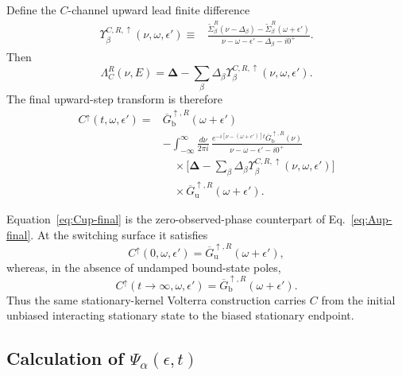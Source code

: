 \documentclass[
 reprint,
 superscriptaddress,
 amsmath,amssymb,
 aps,prb,
 longbibliography,
 floatfix
]{revtex4-2}
\begin{document}
Define the $C$-channel upward lead finite difference
\begin{equation*}
\begin{aligned}
\Upsilon_\beta^{C,R,\uparrow}
(\nu,\omega,\epsilon')
\equiv{}&
\frac{
\widetilde\Sigma_\beta^R(\nu-\Delta_\beta)
-
\widetilde\Sigma_\beta^R(\omega+\epsilon')}
{\nu-\omega-\epsilon'-\Delta_\beta-i0^+}.
\end{aligned}
\end{equation*}
Then
\begin{equation*}
\Lambda_C^R(\nu,E)
=
\bm\Delta
-
\sum_\beta
\Delta_\beta
\Upsilon_\beta^{C,R,\uparrow}
(\nu,\omega,\epsilon').
\end{equation*}
The final upward-step transform is therefore
\begin{equation}
\boxed{
\begin{aligned}
C^\uparrow(t,\omega,\epsilon')
={}&
\overline G_{\mathrm b}^{\uparrow,R}
(\omega+\epsilon')
\\
&-
\int_{-\infty}^{\infty}
\frac{d\nu}{2\pi i}\,
\frac{
e^{-i[\nu-(\omega+\epsilon')]t}
\overline G_{\mathrm b}^{\uparrow,R}(\nu)}
{\nu-\omega-\epsilon'-i0^+}
\\
&\quad\times
\Bigg[
\bm\Delta
-
\sum_\beta
\Delta_\beta
\Upsilon_\beta^{C,R,\uparrow}
(\nu,\omega,\epsilon')
\Bigg]
\\
&\quad\times
\overline G_{\mathrm u}^{\uparrow,R}(\omega+\epsilon').
\end{aligned}}
\label{eq:Cup-final}
\end{equation}

Equation~\eqref{eq:Cup-final} is the zero-observed-phase counterpart of Eq.~\eqref{eq:Aup-final}. At the switching surface it satisfies
\begin{equation*}
C^\uparrow(0,\omega,\epsilon')
=
\overline G_{\mathrm u}^{\uparrow,R}(\omega+\epsilon'),
\end{equation*}
whereas, in the absence of undamped bound-state poles,
\begin{equation*}
C^\uparrow(t\rightarrow\infty,\omega,\epsilon')
=
\overline G_{\mathrm b}^{\uparrow,R}(\omega+\epsilon').
\end{equation*}
Thus the same stationary-kernel Volterra construction carries $C$ from the initial unbiased interacting stationary state to the biased stationary endpoint.

\subsection{Calculation of $\Psi_\alpha(\epsilon,t)$}
\label{sec:up-Psi}
\end{document}
